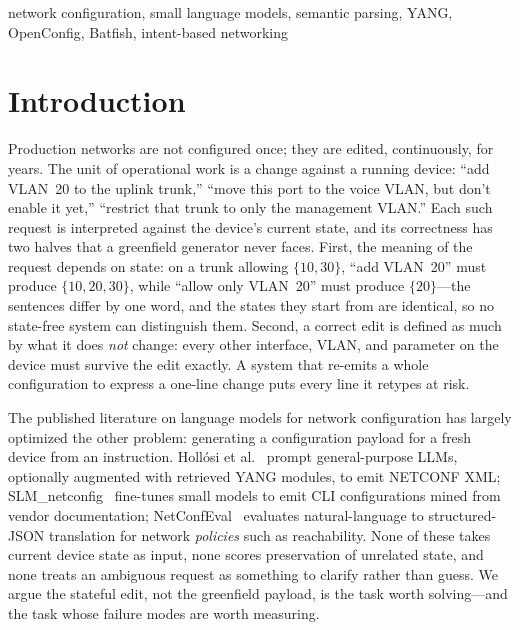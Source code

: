 \documentclass[conference]{IEEEtran}
\begin{document}
\begin{IEEEkeywords}
network configuration, small language models, semantic parsing, YANG, OpenConfig, Batfish, intent-based networking
\end{IEEEkeywords}

\section{Introduction}

Production networks are not configured once; they are edited, continuously, for years. The unit of operational work is a change against a running device: ``add VLAN~20 to the uplink trunk,'' ``move this port to the voice VLAN, but don't enable it yet,'' ``restrict that trunk to only the management VLAN.'' Each such request is interpreted against the device's current state, and its correctness has two halves that a greenfield generator never faces. First, the meaning of the request depends on state: on a trunk allowing $\{10, 30\}$, ``add VLAN~20'' must produce $\{10, 20, 30\}$, while ``allow only VLAN~20'' must produce $\{20\}$---the sentences differ by one word, and the states they start from are identical, so no state-free system can distinguish them. Second, a correct edit is defined as much by what it does \emph{not} change: every other interface, VLAN, and parameter on the device must survive the edit exactly. A system that re-emits a whole configuration to express a one-line change puts every line it retypes at risk.

The published literature on language models for network configuration has largely optimized the other problem: generating a configuration payload for a fresh device from an instruction. Holl\'osi et al.~\cite{hollosi2024netconf} prompt general-purpose LLMs, optionally augmented with retrieved YANG modules, to emit NETCONF XML; SLM\_netconfig~\cite{slmnetconfig2025} fine-tunes small models to emit CLI configurations mined from vendor documentation; NetConfEval~\cite{netconfeval} evaluates natural-language to structured-JSON translation for network \emph{policies} such as reachability. None of these takes current device state as input, none scores preservation of unrelated state, and none treats an ambiguous request as something to clarify rather than guess. We argue the stateful edit, not the greenfield payload, is the task worth solving---and the task whose failure modes are worth measuring.
\end{document}
